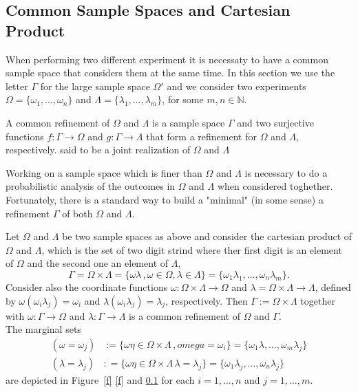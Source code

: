 	\subsection{Common Sample Spaces and Cartesian Product}
	When performing two different experiment it is necessaty to have a common sample space that considers them at the same time. In this section we use the letter $\Gamma$ for the large sample space $\Omega'$ and we consider two experiments $\Omega = \{\omega_1, \ldots, \omega_n\}$ and $\Lambda = \{\lambda_1, \ldots, \lambda_m\}$, for some $m,n \in \mathbb N$. 
	\begin{definition}
		A common refinement of $ \Omega$ and $\Lambda$ is a sample space $\Gamma$ and two surjective functions $f:\Gamma \to \Omega$ and $g:\Gamma \to \Lambda$ that form a refinement for $\Omega$ and $\Lambda$, respectively.  said to be a joint realization of $\Omega$ and $\Lambda$
	\end{definition}
	Working on a sample space which is finer than $\Omega$ and $\Lambda$ is necessary to do a probabilistic analysis of the outcomes in $\Omega$ and $\Lambda$ when considered toghether. Fortunately, there is a standard way to build a "minimal" (in some sense) a refinement $\Gamma$ of both  $\Omega$ and $\Lambda$. 
	\begin{example}
		\label{ex:cartesian_product}
		Let $\Omega$ and $\Lambda$ be two sample spaces as above and consider the cartesian product of $\Omega$ and $\Lambda$, which is the set of two digit strind where ther first digit is an element of $\Omega$ and the second one an element of $\Lambda$, 
		\begin{equation}
				\label{e:cartesian_product}
				\Gamma = \Omega \times \Lambda =\{\omega\lambda\,,\omega \in \Omega, \lambda \in \Lambda\} = \{\omega_1 \lambda_1 ,\ldots, \omega_n\lambda_m\}.
		\end{equation}
		Consider also the coordinate functions $\omega: \Omega \times \Lambda\to \Omega$ and $\lambda = \Omega \times \Lambda \to \Lambda$, defined by $\omega(\omega_i \lambda_j )  = \omega_i$ and $\lambda(\omega_i \lambda_j) = \lambda_j$, respectively. Then $\Gamma := \Omega \times \Lambda$ together with $\omega: \Gamma \to \Omega$ and $\lambda: \Gamma \to \Lambda$ is a common refinement of $\Omega$ and $\Gamma$. \\
		The marginal sets 
		\begin{equation}
			\label{e:marginal}
			\begin{split}
				(\omega = \omega_j) & := \{\omega\eta \in \Omega \times \Lambda\,, omega = \omega_i\} = \{\omega_1\lambda, \ldots, \omega_m\lambda_j\}\\
				(\lambda = \lambda_j) & : = \{ \omega\eta \in \Omega\times \Lambda \, \lambda = \lambda_j\} = \{\omega_1\lambda_j,\ldots , \omega_n \lambda_j\}
			\end{split}
		\end{equation}
		are depicted in Figure~\ref{f}  \ref{f} and \ref{} for each $i = 1,\ldots, n$ and $j = 1,\ldots, m$. 
	\end{example}
